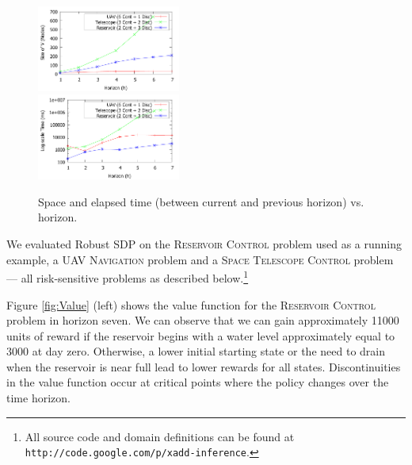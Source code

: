 \documentclass[letterpaper]{article}
\begin{document}
\begin{figure}[tbp!]
\vspace{-2mm}
\centering

\includegraphics[width=0.42\textwidth]{Figures/Nodes.pdf}\\
\vspace{-2mm}
\includegraphics[width=0.42\textwidth]{Figures/Time.pdf}

\vspace{-2mm}
\caption{\footnotesize Space and elapsed time (between current and previous horizon) vs. horizon.
}
\label{fig:SpaceTime}
\vspace{-4mm}
\end{figure}

\label{sec:results}

We evaluated Robust SDP on the \textsc{Reservoir Control} problem used as a running example,
a \textsc{UAV Navigation} problem  and
a \textsc{Space Telescope Control} problem --- all risk-sensitive
problems as described below.\footnote{All source code and domain definitions
can be found at \texttt{http://code.google.com/p/xadd-inference}.}

Figure \ref{fig:Value} (left) shows the value function for the
\textsc{Reservoir Control} problem in horizon seven. We can observe
that we can gain approximately 11000 units of reward if the reservoir
begins with a water level approximately equal to 3000 at day zero.
Otherwise, a lower initial starting state or the need to drain when
the reservoir is near full lead to lower rewards for all states.
Discontinuities in the value function occur at critical points where
the policy changes over the time horizon.
\end{document}
